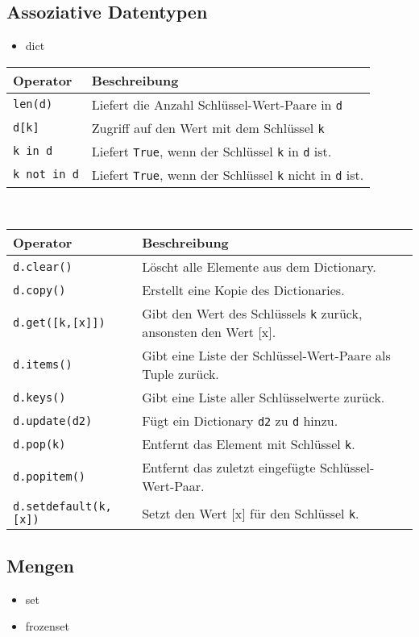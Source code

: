 \subsection{Assoziative Datentypen}
\begin{itemize}
	\item dict
\end{itemize}
\begin{tabular}{|l|l|}
	\hline 
	\textbf{Operator} &\textbf{Beschreibung}\\ 
	\hline 
	\texttt{len(d)} &Liefert die Anzahl Schlüssel-Wert-Paare in \texttt{d}\\
	\texttt{d[k]} &Zugriff auf den Wert mit dem Schlüssel \texttt{k}\\
	\texttt{k in d} &Liefert \texttt{True}, wenn der Schlüssel \texttt{k} in \texttt{d} ist.\\
	\texttt{k not in d} &Liefert \texttt{True}, wenn der Schlüssel \texttt{k} nicht in \texttt{d} ist.\\
	\hline 
\end{tabular}\\
\begin{tabular}{|l|l|}
	\hline 
	\textbf{Operator} &\textbf{Beschreibung}\\ 
	\hline 
	\texttt{d.clear()} &Löscht alle Elemente aus dem Dictionary.\\
	\texttt{d.copy()} &Erstellt eine Kopie des Dictionaries.\\
	\texttt{d.get([k,[x]])} &Gibt den Wert des Schlüssels \texttt{k} zurück, ansonsten den Wert [x].\\
	\texttt{d.items()} &Gibt eine Liste der Schlüssel-Wert-Paare als Tuple zurück.\\
	\texttt{d.keys()} &Gibt eine Liste aller Schlüsselwerte zurück.\\
	\texttt{d.update(d2)} &Fügt ein Dictionary \texttt{d2} zu \texttt{d} hinzu.\\
	\texttt{d.pop(k)} &Entfernt das Element mit Schlüssel \texttt{k}.\\
	\texttt{d.popitem()} &Entfernt das zuletzt eingefügte Schlüssel-Wert-Paar.\\
	\texttt{d.setdefault(k,[x])} &Setzt den Wert [x] für den Schlüssel \texttt{k}.\\
	\hline 
\end{tabular}

\subsection{Mengen}
\begin{itemize}
	\item set
	\item frozenset
\end{itemize}
